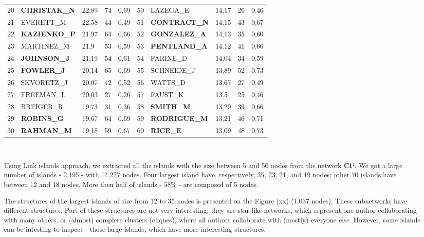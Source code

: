 \documentclass[11pt]{article} %
\begin{document}
\begin{table}
\begin{tabular}{c|l|p{1cm}|p{1cm}|p{1.5cm}||c|l|p{1cm}|p{1cm}|p{1.5cm}|}
20& 	\textbf{CHRISTAK\_N}& 	22,89& 	74& 	0,69& 	50& 	LAZEGA\_E& 	14,17& 	26& 	0,46\\
21& 	EVERETT\_M& 	22,58& 	44& 	0,49& 	51& 	\textbf{CONTRACT\_N}& 	14,15& 	43& 	0,67\\
22& 	\textbf{KAZIENKO\_P}& 	21,97& 	64& 	0,66& 	52& 	\textbf{GONZALEZ\_A}& 	14,13& 	35& 	0,60\\
23& 	MARTINEZ\_M& 	21,9& 	53& 	0,59& 	53& 	\textbf{PENTLAND\_A}& 	14,12& 	41& 	0,66\\
24& 	\textbf{JOHNSON\_J}& 	21,19& 	54& 	0,61& 	54& 	FARINE\_D& 	14,04& 	34& 	0,59\\
25& 	\textbf{FOWLER\_J}& 	20,14& 	65& 	0,69& 	55& 	SCHNEIDE\_J& 	13,89& 	52& 	0,73\\
26& 	SKVORETZ\_J& 	20,07& 	42& 	0,52& 	56& 	WATTS\_D& 	13,67& 	27& 	0,49\\
27& 	FREEMAN\_L& 	20,03& 	27& 	0,26& 	57& 	FAUST\_K& 	13,5& 	25& 	0,46\\
28& 	BREIGER\_R& 	19,73& 	31& 	0,36& 	58& 	\textbf{SMITH\_M}& 	13,29& 	39& 	0,66\\
29& 	\textbf{ROBINS\_G}& 	19,67& 	64& 	0,69& 	59& 	\textbf{RODRIGUE\_M}& 	13,21& 	46& 	0,71\\
30& 	\textbf{RAHMAN\_M}& 	19,18& 	59& 	0,67& 	60& 	\textbf{RICE\_E}& 	13,09& 	48& 	0,73\\
\end{tabular}\\
\end{table}

Using Link islands approach, we extracted all the islands with the size between 5 and 50 nodes from the network \textbf{Ct`}. We got a large number of islands - 2,195 - with 14,227 nodes. Four largest island have, respectively, 35, 23, 21, and 19 nodes; other 70 islands have between 12 and 18 nodes. More then half of islands - 58\% -  are composed of 5 nodes.  \medskip

The structures of the largest islands of size from 12 to 35 nodes is presented on the Figure (xx) (1,037 nodes). These subnetworks have different structures. Part of these structures are not very interesting: they are star-like networks, which represent one author collaborating with many others, or (almost) complete clusters (cliques), where all authors collaborate with (mostly) everyone else. However, some islands can be intesting to inspect - those large islands, which have more interesting structures. \medskip

\end{document}
